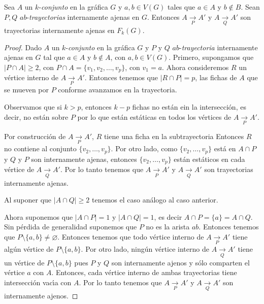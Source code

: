 \begin{lema}%
\label{lem:primero}
Sea $A$ un $k$-\textit{conjunto} en la gr\'afica $G$ y $a, b \in V(G)$ tales que
$a \in A$ y $b \notin B$. Sean $P, Q$ $ab$-\textit{trayectorias} internamente
ajenas en $G$. Entonces $A \xrightarrow[P]{} A'$ y $A \xrightarrow[Q]{} A'$ son
trayectorias internamente ajenas en $F_{k}(G)$.
\end{lema}

\begin{proof}
    Dado $A$ un $k$-\textit{conjunto} en la gr\'afica $G$ y $P$ y $Q$
    $ab$-\textit{trayectoria} internamente ajenas en $G$ tal que $a \in A$ y $b
    \notin A$, con $a, b \in V(G)$. Primero, supongamos que $|P \cap A| \geq 2$,
    con $P \cap A = \{v_{1}, v_{2}, \dots , v_{p}\}$, con $v_{1} = a$. Ahora
    consideremos $R$ un v\'ertice interno de $A \xrightarrow[P]{} A'$. Entonces
    tenemos que  $|R \cap P| = p$, las fichas de $A$ que se mueven por $P$
    conforme avanzamos en la trayectoria. 

    Observamos que si $k>p$, entonces $k -p$ fichas no est\'an ein la
    intersecci\'on, es decir, no est\'an sobre $P$ por lo que est\'an
    est\'aticas en todos los v\'ertices de $A \xrightarrow[P]{} A'$. 

    Por construcci\'on de $A \xrightarrow[P]{} A'$, $R$ tiene una ficha en la
    subtrayectoria %
    Entonces $R$ no contiene al conjunto $\{v_{2}, \dots, v_{p}\}$. Por otro
    lado, como $\{v_{2}, \dots, v_{p}\}$ est\'a en $A \cap P$ y $Q$ y $P$ son
    internamente ajenas, entonces $\{v_{2}, \dots, v_{p}\}$ est\'an est\'aticos
    en cada v\'ertice de $A \xrightarrow[Q]{} A'$. Por lo tanto tenemos que $A
    \xrightarrow[P]{} A'$ y $A \xrightarrow[Q]{}A'$ son trayectorias
    internamente ajenas.

    Al suponer que $|A \cap Q| \geq 2$ tenemos el caso an\'alogo al caso
    anterior.

    Ahora suponemos que $|A \cap P| = 1$ y $|A \cap Q| = 1$, es decir $A \cap P
    = \{a\} = A \cap Q$. Sin p\'erdida de generalidad suponemos que $P$ no es la
    arista $ab$. Entonces tenemos que $P \setminus \{a,b\} \neq \varnothing$.
    Entonces tenemos que todo v\'ertice interno de $A \xrightarrow[P]{} A'$
    tiene alg\'un v\'ertice de $P \setminus \{a, b\}$. Por otro lado, ning\'un
    v\'ertice interno de $A \xrightarrow[Q]{} A'$ tiene un v\'ertice de $P
    \setminus \{a, b\}$ pues $P$ y $Q$ son internamente ajenos y s\'olo
    comparten el v\'ertice $a$ con $A$. Entonces, cada v\'ertice interno de
    ambas trayectorias tiene intersecci\'on vac\'\i{}a con $A$. Por lo tanto
    tenemos que $A \xrightarrow[P]{} A'$ y $A \xrightarrow[Q]{} A'$ son
    internamente ajenos.
\end{proof}

